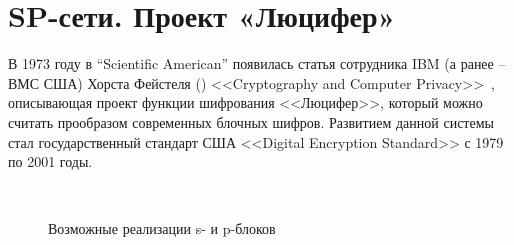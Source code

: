 \section{SP-сети. Проект «Люцифер»}\label{section-project-lucifer}

В 1973 году в \foreignlanguage{english}{``Scientific American''} появилась статья сотрудника IBM (а ранее -- ВМС США) Хорста Фейстеля () <<Cryptography and Computer Privacy>>~\cite{Feistel:1973}, описывающая проект функции шифрования <<Люцифер>>, который можно считать прообразом современных блочных шифров. Развитием данной системы стал государственный стандарт США <<Digital Encryption Standard>> с 1979 по 2001 годы.

\begin{figure}[!t]
    \centering
    ~~~
		\caption{Возможные реализации s- и p-блоков}
\end{figure}

